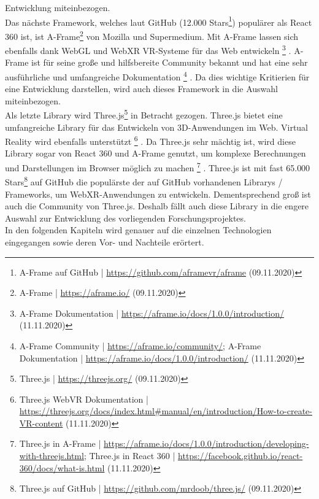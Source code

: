 \documentclass[a4paper,12pt,oneside]{article}
\begin{document}
      Entwicklung miteinbezogen.\\
      Das nächste Framework, welches laut GitHub (12.000 Stars\footnote{A-Frame auf GitHub | \url{https://github.com/aframevr/aframe} (09.11.2020)}) 
      populärer als React 360 ist, ist A-Frame\footnote{A-Frame | \url{https://aframe.io/} (09.11.2020)}
      von Mozilla und Supermedium. Mit A-Frame lassen sich ebenfalls dank
      WebGL und WebXR VR-Systeme für das Web entwickeln
      \footnote{A-Frame Dokumentation | \url{https://aframe.io/docs/1.0.0/introduction/} (11.11.2020)}
      . A-Frame ist für seine große und
      hilfsbereite Community bekannt und hat eine sehr ausführliche und umfangreiche
      Dokumentation
      \footnote{A-Frame Community | \url{https://aframe.io/community/}; A-Frame Dokumentation | \url{https://aframe.io/docs/1.0.0/introduction/} (11.11.2020)}
      . Da dies wichtige Kritierien für eine Entwicklung darstellen, 
      wird auch dieses Framework in die Auswahl miteinbezogen.\\
      Als letzte Library wird Three.js\footnote{Three.js | \url{https://threejs.org/} (09.11.2020)}
      in Betracht gezogen. Three.js bietet eine umfangreiche
      Library für das Entwickeln von 3D-Anwendungen im Web. Virtual Reality wird ebenfalls
      unterstützt
      \footnote{Three.js WebVR Dokumentation | \url{https://threejs.org/docs/index.html\#manual/en/introduction/How-to-create-VR-content} (11.11.2020)}
      . Da Three.js sehr mächtig ist, wird diese Library sogar von React 360
      und A-Frame genutzt, um komplexe Berechnungen und Darstellungen 
      im Browser möglich zu machen
      \footnote{Three.js in A-Frame | \url{https://aframe.io/docs/1.0.0/introduction/developing-with-threejs.html}; Three.js in React 360 | \url{https://facebook.github.io/react-360/docs/what-is.html} (11.11.2020)}
      .
      Three.js ist mit fast 65.000 Stars\footnote{Three.js auf GitHub | \url{https://github.com/mrdoob/three.js/} (09.11.2020)}
      auf GitHub die populärste der auf GitHub 
      vorhandenen Librarys / Frameworks, um WebXR-Anwendungen zu entwickeln. Dementsprechend
      groß ist auch die Community von Three.js. Deshalb fällt auch diese Library in
      die engere Auswahl zur Entwicklung des vorliegenden Forschungsprojektes. \\
      In den folgenden Kapiteln wird genauer auf die einzelnen Technologien 
      eingegangen sowie deren Vor- und Nachteile erörtert.
\end{document}
